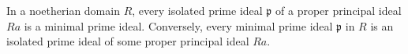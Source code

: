 In a noetherian domain $R$, every isolated prime ideal $\mathfrak{p}$ of a proper principal ideal $Ra$ is a minimal prime ideal. Conversely, every minimal prime ideal $\mathfrak{p}$ in $R$ is an isolated prime ideal of some proper principal ideal $Ra$.
